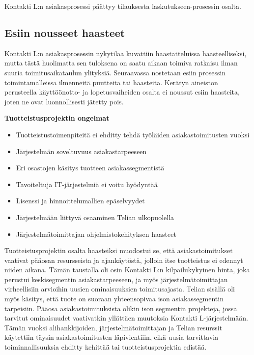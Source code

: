 \documentclass[finnish,12pt,a4paper,pdftex]{article}
\begin{document}
Kontakti L:n asiakasprosessi päättyy tilauksesta laskutukseen-prosessin osalta.

\subsection{Esiin nousseet haasteet}

Kontakti L:n asiakasprosessin nykytilaa kuvattiin haastatteluissa haasteelliseksi, mutta tästä huolimatta sen tuloksena on saatu aikaan toimiva ratkaisu ilman suuria toimitusaikataulun ylityksiä. Seuraavassa nostetaan esiin prosessin toimintamalleissa ilmenneitä puutteita tai haasteita. Kerätyn aineiston perusteella käyttöönotto- ja lopetusvaiheiden osalta ei noussut esiin haasteita, joten ne ovat luonnollisesti jätetty pois.

\textbf{Tuotteistusprojektin ongelmat}\\
\begin{itemize}
    \item Tuotteistustoimenpiteitä ei ehditty tehdä työläiden asiakastoimitusten vuoksi
    \item Järjestelmän soveltuvuus asiakastarpeeseen
    \item Eri osastojen käsitys tuotteen asiakassegmentistä
    \item Tavoiteltuja IT-järjestelmiä ei voitu hyödyntää
    \item Lisenssi ja hinnoittelumallien epäselvyydet
    \item Järjestelmään liittyvä osaaminen Telian ulkopuolella
    \item Järjestelmätoimittajan ohjelmistokehityksen haasteet
\end{itemize}

Tuotteistusprojektin osalta haasteiksi muodostui se, että asiakastoimitukset vaativat pääosan resursseista ja ajankäytöstä, jolloin itse tuotteistus ei edennyt niiden aikana. Tämän taustalla oli osin Kontakti L:n kilpailukykyinen hinta, joka perustui keskisegmentin asiakastarpeeseen, ja myös järjestelmätoimittajan virheellisiin arvioihin uusien ominaisuuksien toimitusajasta. Telian sisällä oli myös käsitys, että tuote on suoraan yhteensopivaa ison asiakassegmentin tarpeisiin. Pääosa asiakastoimituksista olikin ison segmentin projekteja, jossa tarvitut ominaisuudet vaativatkin yllättäen muutoksia Kontakti L-järjestelmään. Tämän vuoksi alihankkijoiden, järjestelmätoimittajan ja Telian resurssit käytettiin täysin asiakastoimitusten läpivientiiin, eikä uusia tarvittavia toiminnallisuuksia ehditty kehittää tai tuotteistusprojektia edistää.\\
\end{document}
